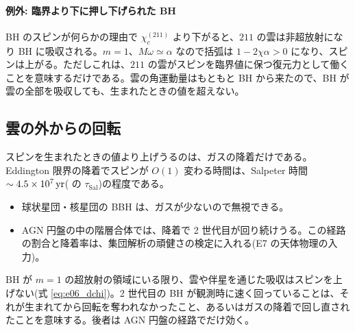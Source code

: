 \paragraph{例外: 臨界より下に押し下げられた BH}
BH のスピンが何らかの理由で $\chi_c^{(211)}$ より下がると、$211$ の雲は非超放射になり BH に吸収される。$m=1$、$M\omega\simeq\alpha$ なので括弧は $1-2\chi\alpha>0$ になり、スピンは上がる。ただしこれは、$211$ の雲がスピンを臨界値に保つ復元力として働くことを意味するだけである。雲の角運動量はもともと BH から来たので、BH が雲の全部を吸収しても、生まれたときの値を超えない。

\subsection{雲の外からの回転}

スピンを生まれたときの値より上げうるのは、ガスの降着だけである。Eddington 限界の降着でスピンが $O(1)$ 変わる時間は、Salpeter 時間 $\sim4.5\times10^7\,\mathrm{yr}$( の $\tau_\mathrm{Sal}$)の程度である。
\begin{itemize}
\item 球状星団・核星団の BBH は、ガスが少ないので無視できる。
\item AGN 円盤の中の階層合体では、降着で 2 世代目が回り続けうる。この経路の割合と降着率は、集団解析の頑健さの検定に入れる(E7 の天体物理の入力)。
\end{itemize}

\begin{result}
BH が $m=1$ の超放射の領域にいる限り、雲や伴星を通じた吸収はスピンを上げない(式 \eqref{eq:e06_dchi})。2 世代目の BH が観測時に速く回っていることは、それが生まれてから回転を奪われなかったこと、あるいはガスの降着で回し直されたことを意味する。後者は AGN 円盤の経路でだけ効く。
\end{result}
